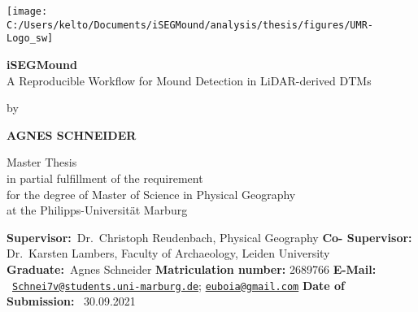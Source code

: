 \documentclass[
  12pt,
]{article}
\author{}
\date{\vspace{-2.5em}}
\begin{document}
\newpage

\allsectionsfont{\centering}
\subsectionfont{\raggedright}
\subsubsectionfont{\raggedright}


\begin{centering}

\vspace{2cm}


\texttt{[image: C:/Users/kelto/Documents/iSEGMound/analysis/thesis/figures/UMR-Logo\_sw]} 

\vspace{1cm}


\Large

\doublespacing
\textbf{iSEGMound} \\
A Reproducible Workflow for Mound Detection in LiDAR-derived DTMs

\vspace{1 cm}

\normalsize
\singlespacing

by

\vspace{0.5 cm}

\bf AGNES SCHNEIDER \\
    
\vspace{1.5 cm}
\normalsize

Master Thesis \\
in partial fulfillment of the requirement \\
for the degree of Master of Science in Physical Geography \\
at the Philipps-Universität Marburg

\vspace{2 cm}
\end{centering}

\textbf{Supervisor:}\space\space\space\space\space~Dr.~Christoph Reudenbach, Physical Geography
\newline
\textbf{Co- Supervisor:} Dr.~Karsten Lambers, Faculty of Archaeology, Leiden University
\vspace{0.5 cm}
\newline
\textbf{Graduate:}\space\space\space\space\space\space\space\space\space\space\space\space\space\space\space~Agnes Schneider
\newline
\textbf{Matriculation number:} 2689766
\newline
\textbf{E-Mail:} \space\space\space\space\space\space\space\space\space\space\space\space\space\space\space\space\space~\href{mailto:Schnei7v@students.uni-marburg.de}{\nolinkurl{Schnei7v@students.uni-marburg.de}}; \href{mailto:euboia@gmail.com}{\nolinkurl{euboia@gmail.com}}
\newline
\textbf{Date of Submission:} \space\space\space~30.09.2021
\end{document}
